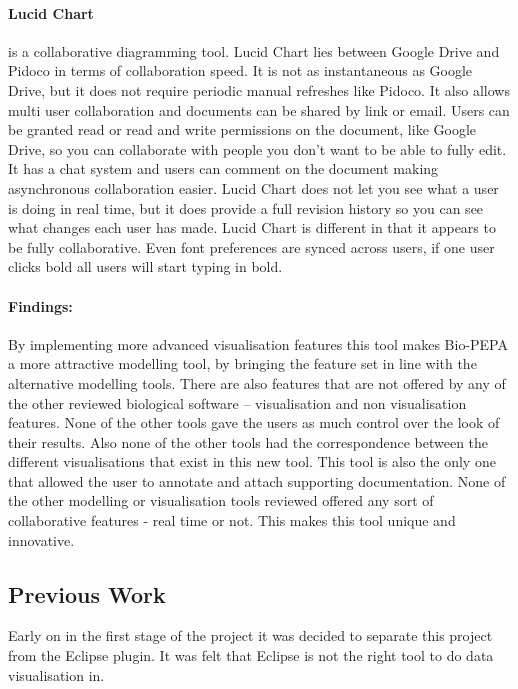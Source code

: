 \paragraph{Lucid Chart} is a collaborative diagramming tool.  Lucid Chart lies between Google Drive and Pidoco in terms of collaboration speed.  It is not as instantaneous as Google Drive, but it does not require periodic manual refreshes like Pidoco.  It also allows multi user collaboration and documents can be shared by link or email.  Users can be granted read or read and write permissions on the document, like Google Drive, so you can collaborate with people you don't want to be able to fully edit.  It has a chat system and users can comment on the document making asynchronous collaboration easier.  Lucid Chart does not let you see what a user is doing in real time, but it does provide a full revision history so you can see what changes each user has made.  Lucid Chart is different in that it appears to be fully collaborative. Even font preferences are synced across users, if one user clicks bold all users will start typing in bold.


\paragraph{Findings:} By implementing more advanced visualisation features this tool makes Bio-PEPA a more attractive modelling tool, by bringing the feature set in line with the alternative modelling tools.  There are also features that are not offered by any of the other reviewed biological software -- visualisation and non visualisation features.  None of the other tools gave the users as much control over the look of their results.  Also none of the other tools had the correspondence between the different visualisations that exist in this new tool.  This tool is also the only one that allowed the user to annotate and attach supporting documentation.  None of the other modelling or visualisation tools reviewed offered any sort of collaborative features - real time or not.  This makes this tool unique and innovative.

\subsection{Previous Work}

Early on in the first stage of the project it was decided to separate this project from the Eclipse plugin.  It was felt that Eclipse is not the right tool to do data visualisation in.

